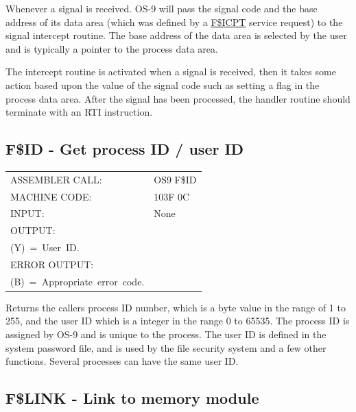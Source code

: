 \documentclass[
]{article}
\newcounter{none} %
\begin{document}
Whenever a signal is received. OS-9 will pass the signal code and the
base address of its data area (which was defined by a
\hyperref[f.icpt]{F\$ICPT} service request) to the signal intercept
routine. The base address of the data area is selected by the user and
is typically a pointer to the process\textquotesingle{} data area.

The intercept routine is activated when a signal is received, then it
takes some action based upon the value of the signal code such as
setting a flag in the process\textquotesingle{} data area. After the
signal has been processed, the handler routine should terminate with an
RTI instruction.

\subsection{F\$ID - Get process ID / user ID}

{\def\LTcaptype{none} %
\begin{longtable}[]{@{}
  >{\raggedright\arraybackslash}p{}
  >{\raggedright\arraybackslash}p{}@{}}
\toprule\noalign{}
\endhead
\bottomrule\noalign{}
\endlastfoot
ASSEMBLER CALL: & OS9 F\$ID \\
MACHINE CODE: & 103F 0C \\
INPUT: & None \\
OUTPUT: & \begin{minipage}[t]{\linewidth}\raggedright
(A)~=~Process~ID.\\
(Y)~=~User~ID.
\end{minipage} \\
ERROR OUTPUT: & \begin{minipage}[t]{\linewidth}\raggedright
(CC)~=~C~bit~set.\\
(B)~=~Appropriate~error~code.
\end{minipage} \\
\end{longtable}
}

Returns the caller\textquotesingle s process ID number, which is a byte
value in the range of 1 to 255, and the user ID which is a integer in
the range 0 to 65535. The process ID is assigned by OS-9 and is unique
to the process. The user ID is defined in the system password file, and
is used by the file security system and a few other functions. Several
processes can have the same user ID.

\subsection{F\$LINK - Link to memory module}\label{f.link}
\end{document}
